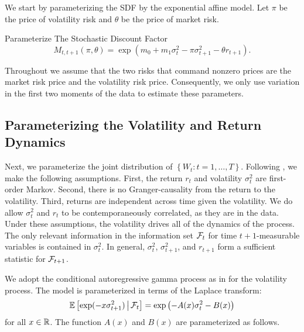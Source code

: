 \documentclass[11pt, letterpaper, twoside]{article}
\begin{document}
We start by parameterizing the SDF by the exponential affine model. Let $\pi$ be the price of volatility risk and $\theta$ be the price of market risk.

\begin{definition}{Parameterize The Stochastic Discount Factor}
 \label{defn:SDF}
%
 \begin{equation}
    M_{t,t+1}(\pi, \theta) = \exp\left(m_{0} + m_1 \sigma_t^2 - \pi \sigma^2_{t+1} - \theta r_{t+1}\right). 
 \end{equation}
\end{definition}

Throughout we assume that the two risks that command nonzero prices are the market risk price and the volatility risk price. Consequently, we only use variation in the first two moments of the data to estimate these parameters. 


\subsection{Parameterizing the Volatility and Return Dynamics}

Next, we parameterize the joint distribution of $\left\lbrace W_t:t=1,\ldots, T\right\rbrace $. 
Following \textcite{han2018leverage}, we make the following assumptions. First, the return $r_t$ and volatility $\sigma^2_t$ are first-order Markov. Second, there is no Granger-causality from the return to the volatility. Third, returns are independent across time given the volatility. We do allow $\sigma^2_{t}$ and $r_{t}$ to be contemporaneously correlated, as they are in the data. 
Under these assumptions, the volatility drives all of the dynamics of the process. The only relevant information in the information set $\mathcal{F}_{t}$ for time $t+1$-measurable variables is contained in $\sigma^2_t$. In general, $\sigma^2_t$, $\sigma^2_{t+1}$, and $r_{t+1}$ form a sufficient statistic for $\mathcal{F}_{t+1}$. 

We adopt the conditional autoregressive gamma process as in \textcite{gourieroux2006autoregressive, han2018leverage} for the volatility process. The model is parameterized in terms of the Laplace transform: 
%
\begin{equation}
    \operatorname{\mathbb{E}}\left[\exp(-x \sigma^2_{t+1}) \,\middle\vert\, \mathcal{F}_{t}\right] = \exp\left(- A(x) \sigma^2_{t} - B(x)\right)
    \label{eqn:vol_laplace_transform}
\end{equation}
%
for all $x \in \mathbb{R}$. The function $A(x)$ and $B(x)$ are parameterized as follows.
\end{document}
